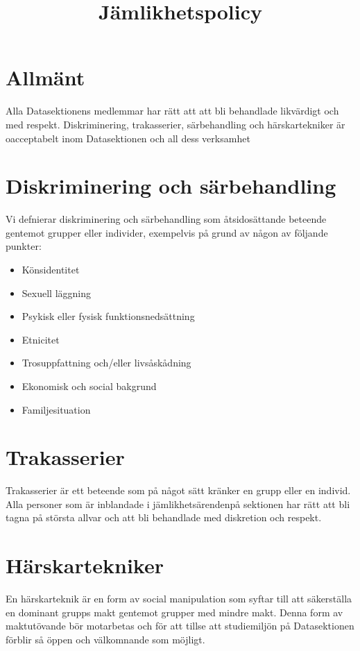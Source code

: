\documentclass{dgovdoc}
\title{Jämlikhetspolicy}
\begin{document}
\maketitle

\section{Allmänt}
Alla Datasektionens medlemmar har rätt att att bli behandlade likvärdigt och med respekt. Diskriminering, trakasserier, särbehandling och härskartekniker är oacceptabelt inom Datasektionen och all dess verksamhet

\section{Diskriminering och särbehandling}
Vi defnierar diskriminering och särbehandling som åtsidosättande beteende gentemot grupper eller individer, exempelvis på grund av någon av följande punkter:

\begin{itemize}
\item Könsidentitet
\item Sexuell läggning
\item Psykisk eller fysisk funktionsnedsättning
\item Etnicitet
\item Trosuppfattning och/eller livsåskådning
\item Ekonomisk och social bakgrund
\item Familjesituation
\end{itemize}

\section{Trakasserier}
Trakasserier är ett beteende som på något sätt kränker en grupp eller en individ. Alla personer som är inblandade i jämlikhetsärendenpå sektionen har rätt att bli tagna på största allvar och att bli behandlade med diskretion och respekt.

\section{Härskartekniker}
En härskarteknik är en form av social manipulation som syftar till att säkerställa en dominant grupps makt gentemot grupper med mindre makt. Denna form av maktutövande bör motarbetas och för att tillse att studiemiljön på Datasektionen förblir så öppen och välkomnande som möjligt.
\end{document}
